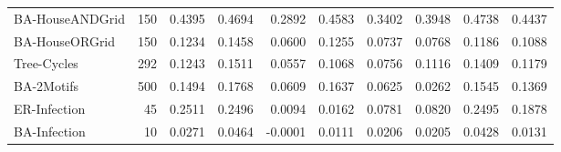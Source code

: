\begin{table}[!htbp]
{\begin{tabular}{@{}lr rr rrrrrr@{}}
BA-HouseANDGrid & 150 & 0.4395 & 0.4694 & 0.2892 & 0.4583 & 0.3402 & 0.3948 & 0.4738 & 0.4437 \\
BA-HouseORGrid & 150 & 0.1234 & 0.1458 & 0.0600 & 0.1255 & 0.0737 & 0.0768 & 0.1186 & 0.1088 \\
Tree-Cycles & 292 & 0.1243 & 0.1511 & 0.0557 & 0.1068 & 0.0756 & 0.1116 & 0.1409 & 0.1179 \\
BA-2Motifs & 500 & 0.1494 & 0.1768 & 0.0609 & 0.1637 & 0.0625 & 0.0262 & 0.1545 & 0.1369 \\
ER-Infection & 45 & 0.2511 & 0.2496 & 0.0094 & 0.0162 & 0.0781 & 0.0820 & 0.2495 & 0.1878 \\
BA-Infection & 10 & 0.0271 & 0.0464 & -0.0001 & 0.0111 & 0.0206 & 0.0205 & 0.0428 & 0.0131 \\
\bottomrule
\end{tabular}%
}
\end{table}

